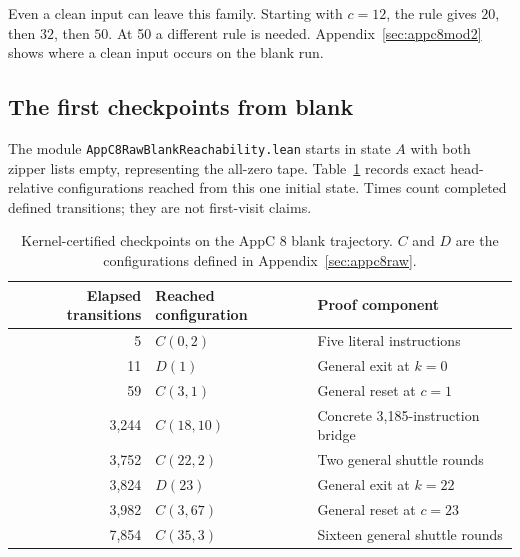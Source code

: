 \documentclass[11pt]{article}
\DeclareRobustCommand{\_}{\ifmmode\sb\else\textunderscore\allowbreak\fi}
\theoremstyle{definition}
\theoremstyle{remark}
\begin{document}
Even a clean input can leave this family. Starting with $c=12$, the rule gives $20$, then $32$, then $50$. At 50 a different rule is needed. Appendix~\ref{sec:appc8mod2} shows where a clean input occurs on the blank run.

\subsection{The first checkpoints from blank}
\label{sec:appc8blank}
The module \texttt{AppC8RawBlankReachability.lean} starts in state $A$ with both zipper lists empty, representing the all-zero tape. Table~\ref{tab:appc8blank} records exact head-relative configurations reached from this one initial state. Times count completed defined transitions; they are not first-visit claims.

\begin{table}[htbp]
\centering\small
\begin{tabular}{rll}
\toprule
Elapsed transitions & Reached configuration & Proof component \\
\midrule
5 & $C(0,2)$ & Five literal instructions \\
11 & $D(1)$ & General exit at $k=0$ \\
59 & $C(3,1)$ & General reset at $c=1$ \\
3,244 & $C(18,10)$ & Concrete 3,185-instruction bridge \\
3,752 & $C(22,2)$ & Two general shuttle rounds \\
3,824 & $D(23)$ & General exit at $k=22$ \\
3,982 & $C(3,67)$ & General reset at $c=23$ \\
7,854 & $C(35,3)$ & Sixteen general shuttle rounds \\
\bottomrule
\end{tabular}
\caption{Kernel-certified checkpoints on the AppC 8 blank trajectory. $C$ and $D$ are the configurations defined in Appendix~\ref{sec:appc8raw}.}
\label{tab:appc8blank}
\end{table}
\end{document}
